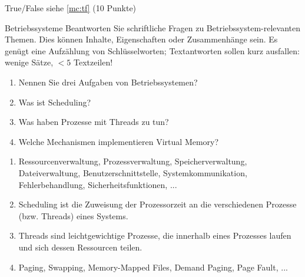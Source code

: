 \documentclass{article}
\begin{document}
\begin{exercise}{True/False}
  siehe \ref{mc:tf} \hfill(10 Punkte)
\end{exercise}

\begin{exercise}[14]{Betriebssysteme}
  Beantworten Sie schriftliche Fragen zu Betriebssystem-relevanten Themen. Dies können Inhalte, Eigenschaften oder Zusammenhänge sein. Es genügt eine Aufzählung von Schlüsselworten; Textantworten sollen kurz ausfallen: wenige Sätze, $<5$ Textzeilen!
  \begin{enumerate}
    \item Nennen Sie drei Aufgaben von Betriebssystemen?\points[3]
    \item Was ist Scheduling?\points[5]
    \item Was haben Prozesse mit Threads zu tun?\points[4]
    \item Welche Mechanismen implementieren Virtual Memory?\points[3]
  \end{enumerate}
\end{exercise}

\begin{solution}
  \begin{enumerate}
    \item Ressourcenverwaltung, Prozessverwaltung, Speicherverwaltung, Dateiverwaltung, Benutzerschnittstelle, Systemkommunikation, Fehlerbehandlung, Sicherheitsfunktionen, ...
    \item Scheduling ist die Zuweisung der Prozessorzeit an die verschiedenen Prozesse (bzw. Threads) eines Systems.
    \item Threads sind leichtgewichtige Prozesse, die innerhalb eines Prozesses laufen und sich dessen Ressourcen teilen.
    \item Paging, Swapping, Memory-Mapped Files, Demand Paging, Page Fault, ...
  \end{enumerate}
\end{solution}
\end{document}

